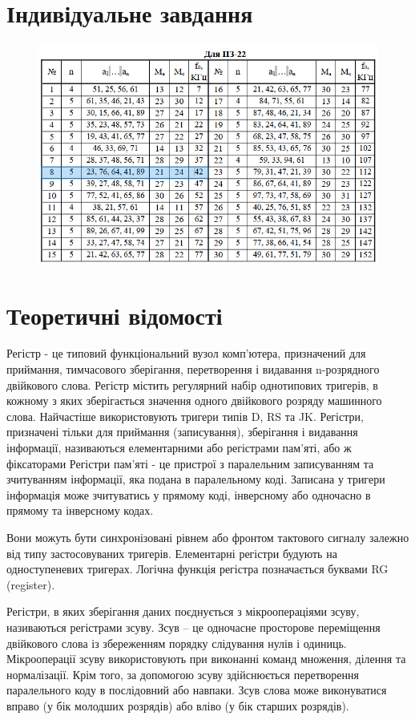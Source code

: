 \documentclass{article}
\begin{document}
\begin{normalsize}
	\section*{Індивідуальне завдання}
\begin{figure}[H]
		\centering
		\includegraphics[scale=0.6]{v}
	\end{figure}	

	\section*{Теоретичні відомості}
	Регістр - це типовий функціональний вузол комп’ютера, призначений для приймання, тимчасового зберігання, перетворення і видавання n-розрядного двійкового слова. Регістр містить регулярний набір однотипових тригерів, в кожному з яких зберігається значення одного двійкового розряду машинного  слова. Найчастіше використовують тригери типів D, RS та JK.
	Регістри, призначені тільки для приймання (записування), зберігання і видавання інформації, називаються елементарними або регістрами пам’яті, або ж фіксаторами Регістри пам’яті - це пристрої з паралельним записуванням та зчитуванням інформації, яка подана в паралельному коді. Записана у тригери інформація може зчитуватись у прямому коді, інверсному або одночасно в прямому та інверсному кодах.
	
	Вони можуть бути синхронізовані рівнем або фронтом тактового сигналу залежно від типу застосовуваних тригерів. Елементарні регістри будують на одноступеневих тригерах. Логічна функція регістра позначається буквами RG (register).
	
	Регістри, в яких зберігання даних поєднується з мікроопераціями зсуву, називаються регістрами зсуву. Зсув – це одночасне просторове переміщення двійкового слова із збереженням порядку слідування нулів і одиниць. Мікрооперації зсуву використовують при виконанні команд множення, ділення та нормалізації. Крім того, за допомогою зсуву здійснюється перетворення паралельного коду в послідовний або навпаки. Зсув слова може виконуватися вправо (у бік молодших розрядів) або вліво (у бік старших розрядів). 
	

\end{normalsize}
\end{document}
